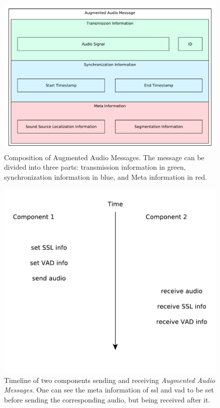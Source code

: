 
\begin{figure}[]
	\centering
	\includegraphics[width=\textwidth]{bilder/rosmsg/augmented_audio.pdf}
	\caption{Composition of Augmented Audio Messages.
		The message can be divided into three parts:
		transmission information in green, synchronization information in blue, and Meta information in red.}
	\label{pic:main:lib:augmented_audio}
\end{figure}

\begin{figure}[]
	\centering
	\includegraphics[width=\textwidth]{diagrams/lib_ssl_vad_time.pdf}
	\caption{Timeline of two components sending and receiving \textit{Augmented Audio Messages}.
		One can see the meta information of \gls{ssl} and \gls{vad} to be set before sending the corresponding audio, but being received after it.}
	\label{pic:main:lib:ssl_vad_time}
\end{figure}

